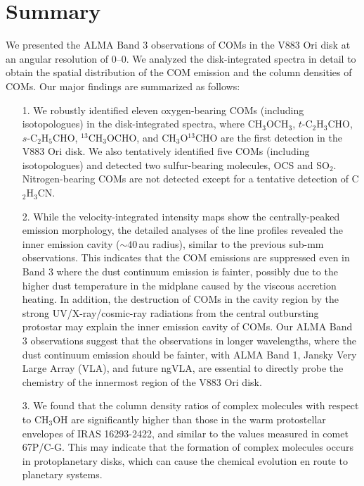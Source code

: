 \documentclass[twocolumn, twocolappendix, astrosymb, times]{aastex631}
\newcommand{\methanol}{CH$_3$OH\xspace}
\newcommand{\methylformate}{CH$_3$OCHO\xspace}
\newcommand{\dimethylether}{CH$_3$OCH$_3$\xspace}
\newcommand{\propenal}{$t$-C$_2$H$_3$CHO\xspace}
\newcommand{\propanal}{$s$-C$_2$H$_5$CHO\xspace}
\begin{document}
\section{Summary} \label{sec:summary}
We presented the ALMA Band 3 observations of COMs in the V883 Ori disk at an angular resolution of 0--0. We analyzed the disk-integrated spectra in detail to obtain the spatial distribution of the COM emission and the column densities of COMs. Our major findings are summarized as follows:
\begin{enumerate}
    \item[1.] We robustly identified eleven oxygen-bearing COMs (including isotopologues) in the disk-integrated spectra, where \dimethylether, \propenal, \propanal, $^{13}$\methylformate, and CH$_3$O$^{13}$CHO are the first detection in the V883 Ori disk. We also tentatively identified five COMs (including isotopologues) and detected two sulfur-bearing molecules, OCS and SO$_2$. Nitrogen-bearing COMs are not detected except for a tentative detection of C$_2$H$_3$CN.
    \item[2.] While the velocity-integrated intensity maps show the centrally-peaked emission morphology, the detailed analyses of the line profiles revealed the inner emission cavity ($\sim40$\,au radius), similar to the previous sub-mm observations. This indicates that the COM emissions are suppressed even in Band 3 where the dust continuum emission is fainter, possibly due to the higher dust temperature in the midplane caused by the viscous accretion heating. In addition, the destruction of COMs in the cavity region by the strong UV/X-ray/cosmic-ray radiations from the central outbursting protostar may explain the inner emission cavity of COMs.  Our ALMA Band 3 observations suggest that the observations in longer wavelengths, where the dust continuum emission should be fainter, with ALMA Band 1, Jansky Very Large Array (VLA), and future ngVLA, are essential to directly probe the chemistry of the innermost region of the V883 Ori disk.
    
    \item[3.] We found that the column density ratios of complex molecules with respect to \methanol are significantly higher than those in the warm protostellar envelopes of IRAS 16293-2422, and similar to the values measured in comet 67P/C-G. This may indicate that the formation of complex molecules occurs in protoplanetary disks, which can cause the chemical evolution en route to planetary systems.
    

\end{enumerate}
\end{document}
